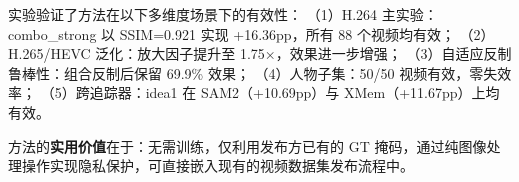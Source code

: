\documentclass[UTF8,a4paper,12pt]{ctexart}
\begin{document}
实验验证了方法在以下多维度场景下的有效性：
（1）H.264 主实验：combo\_strong 以 SSIM=0.921 实现 +16.36pp，所有 88 个视频均有效；
（2）H.265/HEVC 泛化：放大因子提升至 1.75×，效果进一步增强；
（3）自适应反制鲁棒性：组合反制后保留 69.9\% 效果；
（4）人物子集：50/50 视频有效，零失效率；
（5）跨追踪器：idea1 在 SAM2（+10.69pp）与 XMem（+11.67pp）上均有效。

方法的\textbf{实用价值}在于：无需训练，仅利用发布方已有的 GT 掩码，通过纯图像处理操作实现隐私保护，可直接嵌入现有的视频数据集发布流程中。




\end{document}

